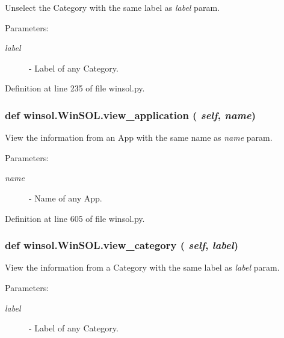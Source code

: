 Unselect the Category with the same label as {\em label\/} param. 

\begin{Desc}
\item[Parameters:]
\begin{description}
\item[{\em label}]- Label of any Category. \end{description}
\end{Desc}


Definition at line 235 of file winsol.py.\hypertarget{classwinsol_1_1WinSOL_381a6ab6e375c75dee6e42a631754745}{
\subsubsection[view\_\-application]{\setlength{\rightskip}{0pt plus 5cm}def winsol.Win\-SOL.view\_\-application ( {\em self},  {\em name})}}
\label{classwinsol_1_1WinSOL_381a6ab6e375c75dee6e42a631754745}


View the information from an App with the same name as {\em name\/} param. 

\begin{Desc}
\item[Parameters:]
\begin{description}
\item[{\em name}]- Name of any App. \end{description}
\end{Desc}


Definition at line 605 of file winsol.py.\hypertarget{classwinsol_1_1WinSOL_f0e8c6905304639fba8b8267d73b1b49}{
\subsubsection[view\_\-category]{\setlength{\rightskip}{0pt plus 5cm}def winsol.Win\-SOL.view\_\-category ( {\em self},  {\em label})}}
\label{classwinsol_1_1WinSOL_f0e8c6905304639fba8b8267d73b1b49}


View the information from a Category with the same label as {\em label\/} param. 

\begin{Desc}
\item[Parameters:]
\begin{description}
\item[{\em label}]- Label of any Category. \end{description}
\end{Desc}


